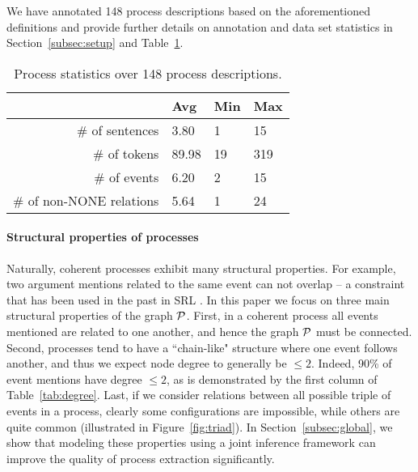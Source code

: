We have annotated 148 process descriptions based on the aforementioned definitions and provide further details on annotation and data set statistics in Section~\ref{subsec:setup} and Table~\ref{tab:datastats}.

\begin{table}[t]
{\small
\hfill{}
\begin{tabular}{ r | l | l | l }
&\textbf{Avg}&\textbf{Min} & \textbf{Max}\\
\hline
\# of sentences            &     3.80       &    1        &   15 \\ 
\# of tokens            &     89.98        &   19        & 319  \\ 
\# of events                &   6.20         &       2   &  15  \\ 
\# of non-\textsc{NONE} relations          &     5.64       &      1        &  24 \\ 
\end{tabular}}
\hfill{}
\caption{Process statistics over 148 process descriptions.}
\label{tab:datastats}
\end{table}

\paragraph{Structural properties of processes} 
Naturally, coherent processes exhibit many structural properties. For example, two argument mentions related to the same event can not overlap -- a constraint that has been used in the past in SRL \cite{Toutanova08}. In this paper we focus on three main structural properties of the graph $\mathcal{P}$. First, in a coherent process all events mentioned are related to one another, and hence the graph $\mathcal{P}$ must be connected. Second, processes tend to have a ``chain-like" structure where one event follows another, and thus we expect node degree to generally be $\leq 2$. Indeed, 90\% of event mentions have degree $\leq2$, as is demonstrated by the first column of Table~\ref{tab:degree}. Last, if we consider relations between all possible triple of events in a process, clearly some configurations are impossible, while others are quite common (illustrated in Figure~\ref{fig:triad}). In Section~\ref{subsec:global}, we show that modeling these properties using a joint inference framework can improve the quality of process extraction significantly.

